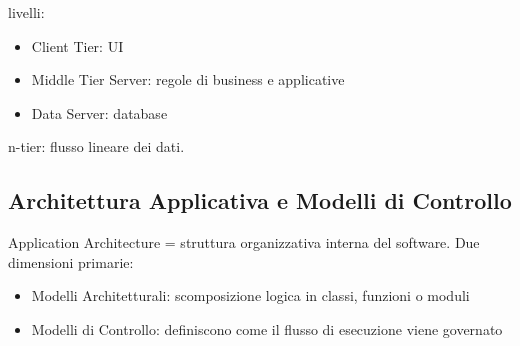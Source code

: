 \documentclass[12pt]{extarticle}
\begin{document}
 livelli:
\begin{itemize}
    \item Client Tier: UI
    \item Middle Tier Server: regole di business e applicative
    \item Data Server: database
\end{itemize}

\noindent n-tier: flusso lineare dei dati.

\newpage

\subsection{Architettura Applicativa e Modelli di Controllo}
Application Architecture = struttura organizzativa interna del software. Due dimensioni primarie:
\begin{itemize}
    \item Modelli Architetturali: scomposizione logica in classi, funzioni o moduli
    \item Modelli di Controllo: definiscono come il flusso di esecuzione viene governato
\end{itemize}
\end{document}
